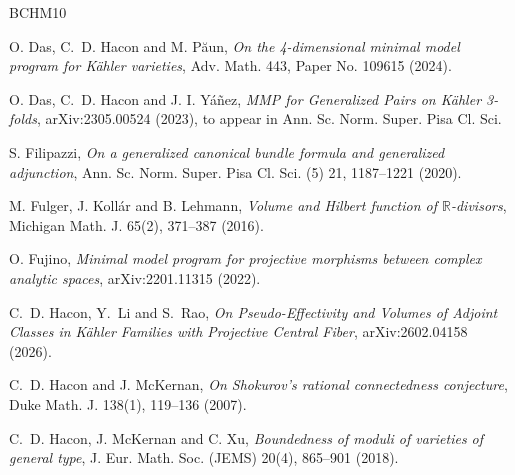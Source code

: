 \documentclass[11pt]{amsart}
\numberwithin{equation}{section}
\theoremstyle{definition}
\theoremstyle{definition}
\theoremstyle{definition}
\begin{document}
\begin{thebibliography}{BCHM10}

 O. Das, C.~D. Hacon and M. P\u{a}un, {\it On the 4-dimensional minimal model program for K\"ahler varieties}, Adv. Math. 443, Paper No. 109615 (2024).

 O. Das, C.~D. Hacon and J. I. Y\'a\~nez, {\it MMP for Generalized Pairs on K\"ahler 3-folds}, arXiv:2305.00524 (2023), to appear in Ann. Sc. Norm. Super. Pisa Cl. Sci.

 S. Filipazzi, {\it On a generalized canonical bundle formula and generalized adjunction}, Ann. Sc. Norm. Super. Pisa Cl. Sci. (5) 21, 1187--1221 (2020).

 M. Fulger, J. Koll\'ar and B. Lehmann, {\it Volume and Hilbert function of $\mathbb{R}$-divisors}, Michigan Math. J. 65(2), 371--387 (2016).


 O. Fujino, {\it Minimal model program for projective morphisms between complex analytic spaces}, arXiv:2201.11315 (2022).




 C.~D. Hacon, Y.~Li and S.~Rao, {\it On Pseudo-Effectivity and Volumes of Adjoint Classes in K\"ahler Families with Projective Central Fiber}, arXiv:2602.04158 (2026).

 C.~D. Hacon and J. McKernan, {\it On Shokurov's rational connectedness conjecture}, Duke Math. J. 138(1), 119--136 (2007).

 C.~D. Hacon, J. McKernan and C. Xu, {\it Boundedness of moduli of varieties of general type}, J. Eur. Math. Soc. (JEMS) 20(4), 865--901 (2018).


\end{thebibliography}
\end{document}
